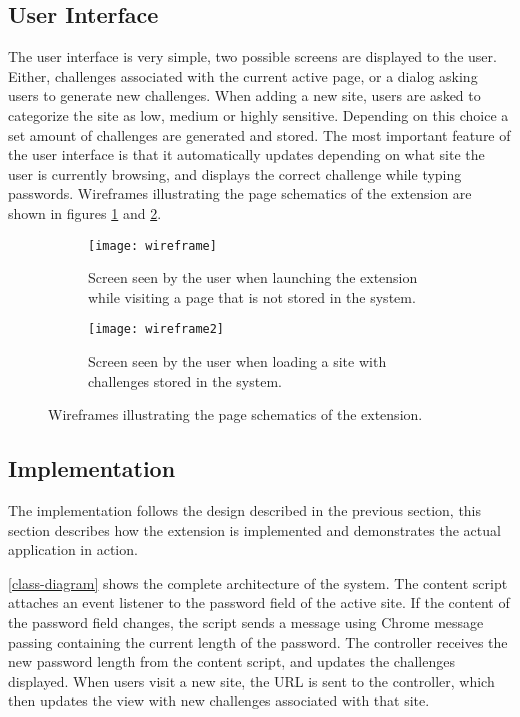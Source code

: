 \subsection{User Interface}
The user interface is very simple, two possible screens are displayed to the user. Either, challenges associated with the current active page, or a dialog asking users to generate new challenges. When adding a new site, users are asked to categorize the site as low, medium or highly sensitive. Depending on this choice a set amount of challenges are generated and stored. The most important feature of the user interface is that it automatically updates depending on what site the user is currently browsing, and displays the correct challenge while typing passwords. Wireframes illustrating the page schematics of the extension are shown in figures \ref{add-new-screen} and \ref{challenge-screen}. 

\begin{figure}[ht]
    \centering
    \begin{subfigure}[t]{0.45\textwidth}
        \centering
        \texttt{[image: wireframe]} 
        \caption{Screen seen by the user when launching the extension while visiting a page that is not stored in the system.}
        \label{add-new-screen}
    \end{subfigure}
    \hfill
    \begin{subfigure}[t]{0.45\textwidth}
        \centering
        \texttt{[image: wireframe2]} 
        \caption{Screen seen by the user when loading a site with challenges stored in the system. }
        \label{challenge-screen}
    \end{subfigure}
    \caption{Wireframes illustrating the page schematics of the extension.}
    \label{wireframes}
\end{figure}

\subsection{Implementation}
The implementation follows the design described in the previous section, this section describes how the extension is implemented and demonstrates the actual application in action. 


\par \autoref{class-diagram} shows the complete architecture of the system.
 The content script attaches an event listener to the password field of the active site. If the content of the password field changes, the script sends a message using Chrome message passing containing the current length of the password. The controller receives the new password length from the content script, and updates the challenges displayed. When users visit a new site, the URL is sent to the controller, which then updates the view with new challenges associated with that site.


